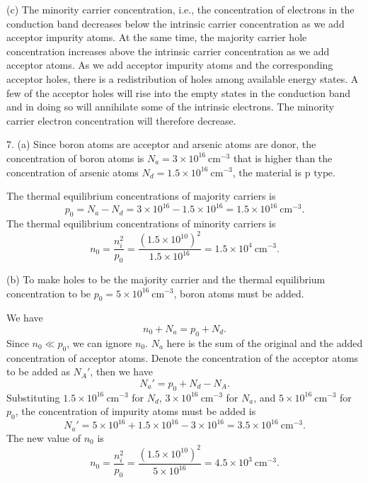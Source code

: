 \documentclass[a4paper]{article}
\begin{document}
(c) The minority carrier concentration, i.e., the concentration of electrons in the conduction band decreases below the intrinsic carrier concentration as we add acceptor impurity atoms. At the same time, the majority carrier hole concentration increases above the intrinsic carrier concentration as we add acceptor atoms. As we add acceptor impurity atoms and the corresponding acceptor holes, there is a redistribution of holes among available energy states. A few of the acceptor holes will rise into the empty states in the conduction band and in doing so will annihilate some of the intrinsic electrons. The minority carrier electron concentration will therefore decrease.

7. (a) Since boron atoms are acceptor and arsenic atoms are donor, the concentration of boron atoms is $N_a=3\times10^{16}\ \text{cm}^{-3}$ that is higher than the concentration of arsenic atoms $N_d=1.5\times10^{16}\ \text{cm}^{-3}$, the material is $\boxed{\text{p type}}$.

The thermal equilibrium concentrations of majority carriers is
$$p_0=N_a-N_d=3\times10^{16}-1.5\times10^{16}=1.5\times10^{16}\ \text{cm}^{-3}.$$
The thermal equilibrium concentrations of minority carriers is
$$n_0=\frac{n_i^2}{p_0}=\frac{(1.5\times10^{10})^2}{1.5\times10^{16}}=1.5\times10^{4}\ \text{cm}^{-3}.$$

(b) To make holes to be the majority carrier and the thermal equilibrium concentration to be $p_0=5\times10^{16}\ \text{cm}^{-3}$, boron atoms must be added.

We have
$$n_0+N_a=p_0+N_d.$$
Since $n_0\ll p_0$, we can ignore $n_0$. $N_a$ here is the sum of the original and the added concentration of acceptor atoms. Denote the concentration of the acceptor atoms to be added as $N_A'$, then we have
$$N_a'=p_0+N_d-N_A.$$
Substituting $1.5\times10^{16}\ \text{cm}^{-3}$ for $N_d$, $3\times10^{16}\ \text{cm}^{-3}$ for $N_a$, and $5\times10^{16}\ \text{cm}^{-3}$ for $p_0$, the concentration of impurity atoms must be added is
$$N_a'=5\times10^{16}+1.5\times10^{16}-3\times10^{16}=3.5\times10^{16}\ \text{cm}^{-3}.$$
The new value of $n_0$ is
$$n_0=\frac{n_i^2}{p_0}=\frac{(1.5\times10^{10})^2}{5\times10^{16}}=4.5\times10^{3}\ \text{cm}^{-3}.$$
\end{document}
